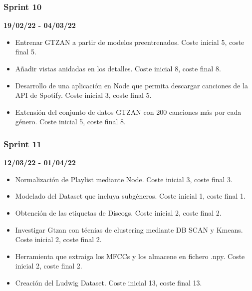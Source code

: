 \subsubsection{Sprint 10}
\textbf{19/02/22 - 04/03/22}
\begin{itemize}
    \item Entrenar GTZAN a partir de modelos preentrenados. Coste inicial 5, coste final 5.
    \item Añadir vistas anidadas en los detalles. Coste inicial 8, coste final 8.
    \item Desarrollo de una aplicación en Node que permita descargar canciones de la API de Spotify. Coste inicial 3, coste final 5.
    \item Extensión del conjunto de datos GTZAN con 200 canciones más por cada género. Coste inicial 5, coste final 8. 

\end{itemize}

\subsubsection{Sprint 11}
\textbf{12/03/22 - 01/04/22}

\begin{itemize}
    \item Normalización de Playlist mediante Node. Coste inicial 3, coste final 3.
    \item Modelado del Dataset que incluya subgéneros. Coste inicial 1, coste final 1.
    \item Obtención de las etiquetas de Discogs. Coste inicial 2, coste final 2.
    \item Investigar Gtzan con técnias de clustering mediante DB SCAN y Kmeans. Coste inicial 2, coste final 2.
    \item Herramienta que extraiga los MFCCs y los almacene en fichero .npy. Coste inicial 2, coste final 2.
    \item Creación del Ludwig Dataset. Coste inicial 13, coste final 13.
\end{itemize}



